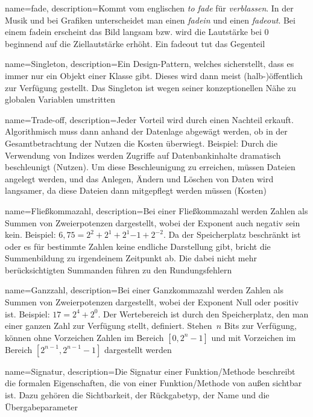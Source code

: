 {
	name={fade},
	description={Kommt vom englischen \emph{to fade} für \emph{verblassen}. In der Musik und bei Grafiken unterscheidet man einen \emph{fadein} und einen \emph{fadeout}. Bei einem fadein erscheint das Bild langsam bzw. wird die Lautstärke bei 0 beginnend auf die Ziellautstärke erhöht. Ein fadeout tut das Gegenteil} 
}

{
	name={Singleton},
	description={Ein Design-Pattern, welches sicherstellt, dass es immer nur ein Objekt einer Klasse gibt. Dieses wird dann meist (halb-)öffentlich zur Verfügung gestellt. Das Singleton ist wegen seiner konzeptionellen Nähe zu globalen Variablen umstritten} 
}

{
    name={Trade-off},
    description={Jeder Vorteil wird durch einen Nachteil erkauft. Algorithmisch muss dann anhand der Datenlage abgewägt werden, ob in der Gesamtbetrachtung der Nutzen die Kosten überwiegt. Beispiel: Durch die Verwendung von Indizes werden Zugriffe auf Datenbankinhalte dramatisch beschleunigt (Nutzen). Um diese Beschleunigung zu erreichen, müssen Dateien angelegt werden, und das Anlegen, Ändern und Löschen von Daten wird langsamer, da diese Dateien dann mitgepflegt werden müssen (Kosten)} 
}

{
    name={Fließkommazahl},
    description={Bei einer Fließkommazahl werden Zahlen als Summen von Zweierpotenzen dargestellt, wobei der Exponent auch negativ sein kein. Beispiel: $6,75 = 2^2 + 2^1 + 2^1{-1} + 2^{-2}$. Da der Speicherplatz beschränkt ist oder es für bestimmte Zahlen keine endliche Darstellung gibt, bricht die Summenbildung zu irgendeinem Zeitpunkt ab. Die dabei nicht mehr berücksichtigten Summanden führen zu den Rundungsfehlern}
}

{
    name={Ganzzahl},
    description={Bei einer Ganzkommazahl werden Zahlen als Summen von Zweierpotenzen dargestellt, wobei der Exponent Null oder positiv ist. Beispiel: $17 = 2^4 + 2^0$. Der Wertebereich ist durch den Speicherplatz, den man einer ganzen Zahl zur Verfügung stellt, definiert. Stehen~$n$ Bits zur Verfügung, können ohne Vorzeichen Zahlen im Bereich $[0, 2^n-1]$ und mit Vorzeichen im Bereich $[2^{n-1}, 2^{n-1}-1]$ dargestellt werden} 
}


{
	name={Signatur},
	description={Die Signatur einer Funktion/Methode beschreibt die formalen Eigenschaften, die von einer Funktion/Methode von außen sichtbar ist. Dazu gehören die Sichtbarkeit, der Rückgabetyp, der Name und die Übergabeparameter} 
}



